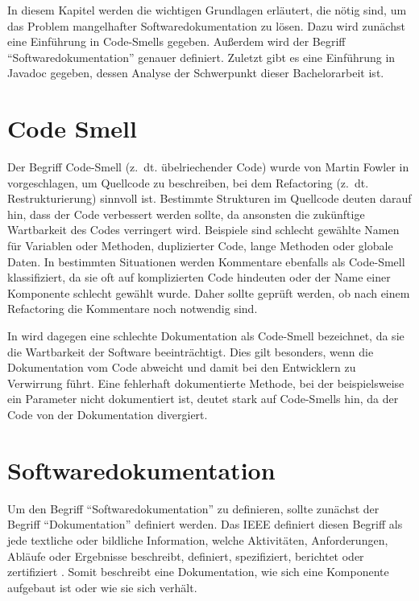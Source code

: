 \label{sec:background}
In diesem Kapitel werden die wichtigen Grundlagen erläutert, die nötig sind, um das Problem mangelhafter Softwaredokumentation zu lösen.  Dazu wird zunächst eine Einführung in Code-Smells gegeben. Außerdem wird der Begriff \enquote{Softwaredokumentation} genauer definiert. Zuletzt gibt es eine Einführung in Javadoc gegeben, dessen Analyse der Schwerpunkt dieser Bachelorarbeit ist.
\section{Code Smell}\label{chapter:code_smell}
Der Begriff Code-Smell (z.~dt. übelriechender Code)  wurde von Martin Fowler in \cite[S. 71 ff.]{fowler2019refactoring}  vorgeschlagen, um Quellcode zu beschreiben, bei dem Refactoring (z.~dt. Restrukturierung) sinnvoll ist. Bestimmte Strukturen im Quellcode deuten darauf hin, dass der Code verbessert werden sollte, da ansonsten die zukünftige Wartbarkeit des Codes verringert wird. Beispiele sind schlecht gewählte Namen für Variablen oder Methoden, duplizierter Code, lange Methoden oder globale Daten. In bestimmten Situationen werden Kommentare ebenfalls als Code-Smell klassifiziert, da sie oft auf komplizierten  Code hindeuten oder der Name einer Komponente schlecht gewählt wurde. Daher sollte geprüft werden, ob nach einem Refactoring die Kommentare noch notwendig sind.

In \cite[S. 249-250]{JavadocViolationsandTheirEvolutioninOpen-SourceSoftware} wird dagegen eine schlechte Dokumentation als Code-Smell bezeichnet, da sie die Wartbarkeit der Software beeinträchtigt. Dies gilt besonders, wenn die Dokumentation vom Code abweicht und damit bei den Entwicklern zu Verwirrung führt. Eine fehlerhaft dokumentierte Methode, bei der beispielsweise ein Parameter nicht dokumentiert ist, deutet stark auf Code-Smells hin, da der Code von der Dokumentation divergiert.  

\section{Softwaredokumentation}\label{chapter:documentation}
Um den Begriff \enquote{Softwaredokumentation} zu definieren, sollte zunächst der Begriff \enquote{Dokumentation} definiert werden. Das IEEE  definiert diesen Begriff als jede textliche oder bildliche Information, welche Aktivitäten, Anforderungen, Abläufe oder Ergebnisse beschreibt, definiert, spezifiziert, berichtet oder zertifiziert \cite[S. 28]{IEEEStandardGlossaryofSoftwareEngineeringTerminology}. Somit beschreibt eine Dokumentation, wie sich eine Komponente aufgebaut ist oder wie sie sich verhält.

